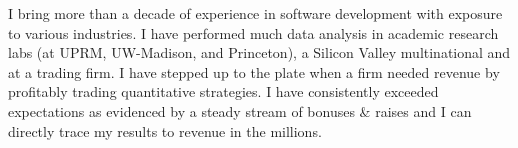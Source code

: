 

\begin{cvparagraph}

	I bring more than a decade of experience in software development with exposure to various industries. I have performed much data analysis in academic research labs (at UPRM, UW-Madison, and Princeton), a Silicon Valley multinational and at a trading firm. I have stepped up to the plate when a firm needed revenue by profitably trading quantitative strategies. I have consistently exceeded expectations as evidenced by a steady stream of bonuses \& raises and I can directly trace my results to revenue in the millions.
\end{cvparagraph}
